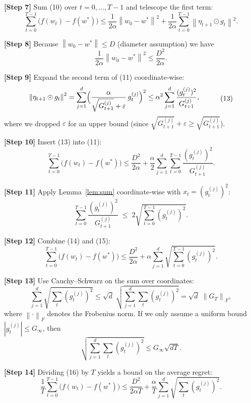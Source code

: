 \documentclass[11pt]{article}
\newcommand{\norm}[1]{\left\| #1 \right\|}
\begin{document}
\noindent\textbf{[Step 7]}  
Sum (10) over $t=0,\dots,T-1$ and telescope the first term:
\[
\sum_{t=0}^{T-1}\bigl(f(w_{t})-f(w^{*})\bigr)
\le
\frac{1}{2\alpha}\norm{w_{0}-w^{*}}^{2}
+\frac{1}{2\alpha}\sum_{t=0}^{T-1}\norm{\eta_{t+1}\odot g_{t}}^{2}.
\tag{11}
\]

\noindent\textbf{[Step 8]}  
Because $\norm{w_{0}-w^{*}}\le D$ (diameter assumption) we have
\[
\frac{1}{2\alpha}\norm{w_{0}-w^{*}}^{2}\le \frac{D^{2}}{2\alpha}.
\tag{12}
\]

\noindent\textbf{[Step 9]}  
Expand the second term of (11) coordinate‑wise:
\[
\begin{aligned}
\norm{\eta_{t+1}\odot g_{t}}^{2}
&=\sum_{j=1}^{d}\Bigl(\frac{\alpha}{\sqrt{G_{t+1}^{(j)}}+\varepsilon}\,g_{t}^{(j)}\Bigr)^{2}
\le \alpha^{2}\sum_{j=1}^{d}\frac{(g_{t}^{(j)})^{2}}{G_{t+1}^{(j)}} ,
\end{aligned}
\tag{13}
\]
where we dropped $\varepsilon$ for an upper bound (since $\sqrt{G_{t+1}^{(j)}}+\varepsilon\ge\sqrt{G_{t+1}^{(j)}}$).

\noindent\textbf{[Step 10]}  
Insert (13) into (11):
\[
\sum_{t=0}^{T-1}\bigl(f(w_{t})-f(w^{*})\bigr)
\le
\frac{D^{2}}{2\alpha}
+\frac{\alpha}{2}\sum_{j=1}^{d}\sum_{t=0}^{T-1}\frac{(g_{t}^{(j)})^{2}}{G_{t+1}^{(j)}} .
\tag{14}
\]

\noindent\textbf{[Step 11]}  
Apply Lemma~\ref{lem:sum} coordinate‑wise with $x_{t}=(g_{t}^{(j)})^{2}$:
\[
\sum_{t=0}^{T-1}\frac{(g_{t}^{(j)})^{2}}{G_{t+1}^{(j)}}
\;\le\;
2\sqrt{\sum_{t=0}^{T-1}(g_{t}^{(j)})^{2}} .
\tag{15}
\]

\noindent\textbf{[Step 12]}  
Combine (14) and (15):
\[
\sum_{t=0}^{T-1}\bigl(f(w_{t})-f(w^{*})\bigr)
\le
\frac{D^{2}}{2\alpha}
+\alpha\sum_{j=1}^{d}\sqrt{\sum_{t=0}^{T-1}(g_{t}^{(j)})^{2}} .
\tag{16}
\]

\noindent\textbf{[Step 13]}  
Use Cauchy–Schwarz on the sum over coordinates:
\[
\sum_{j=1}^{d}\sqrt{\sum_{t}(g_{t}^{(j)})^{2}}
\le
\sqrt{d}\;\sqrt{\sum_{j=1}^{d}\sum_{t}(g_{t}^{(j)})^{2}}
= \sqrt{d}\;\norm{G_{T}}_{F},
\tag{17}
\]
where $\norm{\cdot}_{F}$ denotes the Frobenius norm.  
If we only assume a uniform bound $|g_{t}^{(j)}|\le G_{\infty}$, then
\[
\sqrt{\sum_{j=1}^{d}\sum_{t}(g_{t}^{(j)})^{2}}
\le G_{\infty}\sqrt{dT}.
\tag{18}
\]

\noindent\textbf{[Step 14]}  
Dividing (16) by $T$ yields a bound on the average regret:
\[
\frac{1}{T}\sum_{t=0}^{T-1}\bigl(f(w_{t})-f(w^{*})\bigr)
\le
\frac{D^{2}}{2\alpha T}
+\frac{\alpha}{T}\sum_{j=1}^{d}\sqrt{\sum_{t}(g_{t}^{(j)})^{2}} .
\tag{19}
\]
\end{document}
